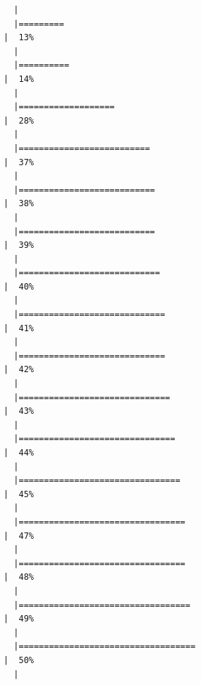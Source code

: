 \documentclass[
  letterpaper,
  DIV=11,
  numbers=noendperiod]{scrreprt}
\begin{document}
\begin{verbatim}
  |                                                                            
  |=========                                                             |  13%
  |                                                                            
  |==========                                                            |  14%
  |                                                                            
  |===================                                                   |  28%
  |                                                                            
  |==========================                                            |  37%
  |                                                                            
  |===========================                                           |  38%
  |                                                                            
  |===========================                                           |  39%
  |                                                                            
  |============================                                          |  40%
  |                                                                            
  |=============================                                         |  41%
  |                                                                            
  |=============================                                         |  42%
  |                                                                            
  |==============================                                        |  43%
  |                                                                            
  |===============================                                       |  44%
  |                                                                            
  |================================                                      |  45%
  |                                                                            
  |=================================                                     |  47%
  |                                                                            
  |=================================                                     |  48%
  |                                                                            
  |==================================                                    |  49%
  |                                                                            
  |===================================                                   |  50%
  |                                                                            

\end{verbatim}
\end{document}
